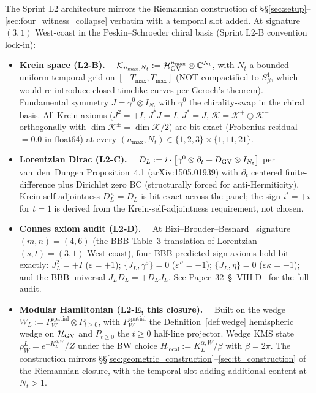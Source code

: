 \documentclass[11pt,a4paper]{article}
\theoremstyle{plain}
\theoremstyle{definition}
\newcommand{\nmax}{n_{\max}}
\begin{document}
The Sprint L2 architecture mirrors the Riemannian construction of
\S\S\ref{sec:setup}--\ref{sec:four_witness_collapse} verbatim with a
temporal slot added.  At signature $(3, 1)$ West-coast in the
Peskin--Schroeder chiral basis (Sprint L2-B convention lock-in):

\begin{itemize}\setlength{\itemsep}{2pt}
\item \textbf{Krein space (L2-B).}\ \ %
$\mathcal{K}_{\nmax, N_t} := \mathcal{H}_{\rm GV}^{\nmax} \otimes
\mathbb{C}^{N_t}$, with $N_t$ a bounded uniform temporal grid on
$[-T_{\max}, T_{\max}]$ (NOT compactified to $S^1_\beta$, which would
re-introduce closed timelike curves per Geroch's theorem).  Fundamental
symmetry $J = \gamma^0 \otimes I_{N_t}$ with $\gamma^0$ the chirality-swap
in the chiral basis.  All Krein axioms ($J^2 = +I$, $J^* J = I$,
$J^* = J$, $\mathcal{K} = \mathcal{K}^+ \oplus \mathcal{K}^-$
orthogonally with $\dim \mathcal{K}^\pm = \dim \mathcal{K}/2$) are
bit-exact (Frobenius residual $= 0.0$ in float64) at every
$(\nmax, N_t) \in \{1, 2, 3\} \times \{1, 11, 21\}$.

\item \textbf{Lorentzian Dirac (L2-C).}\ \ %
$D_L := i \cdot \bigl[\gamma^0 \otimes \partial_t + D_{\rm GV} \otimes I_{N_t}\bigr]$
per van~den~Dungen Proposition~4.1 (arXiv:1505.01939) with
$\partial_t$ centered finite-difference plus Dirichlet zero BC
(structurally forced for anti-Hermiticity).  Krein-self-adjointness
$D_L^\times = D_L$ is bit-exact across the panel; the sign $i^t = +i$
for $t = 1$ is derived from the Krein-self-adjointness requirement,
not chosen.

\item \textbf{Connes axiom audit (L2-D).}\ \ %
At Bizi--Brouder--Besnard~\cite{bizi_brouder_besnard2018} signature
$(m, n) = (4, 6)$ (the BBB Table~3 translation of Lorentzian $(s, t) = (3, 1)$
West-coast), four BBB-predicted-sign axioms hold bit-exactly:
$J_L^2 = +I$ ($\varepsilon = +1$); $\{J_L, \gamma^5\} = 0$
($\varepsilon'' = -1$); $\{J_L, \eta\} = 0$ ($\varepsilon \kappa = -1$);
and the BBB universal $J_L D_L = +D_L J_L$.  See Paper~32~\S~VIII.D~\cite{paper32}
for the full audit.

\item \textbf{Modular Hamiltonian (L2-E, this closure).}\ \ %
Built on the wedge $W_L := P_W^{\mathrm{spatial}} \otimes P_{t \geq 0}$,
with $P_W^{\mathrm{spatial}}$ the Definition~\ref{def:wedge}
hemispheric wedge on $\mathcal{H}_{\rm GV}$ and $P_{t \geq 0}$ the
$t \geq 0$ half-line projector.  Wedge KMS state $\rho_W^L = e^{-K_L^{\alpha, W}}/Z$
under the BW choice $H_{\mathrm{local}} := K_L^{\alpha, W}/\beta$
with $\beta = 2\pi$.  The construction mirrors
\S\S\ref{sec:geometric_construction}--\ref{sec:tt_construction}
of the Riemannian closure, with the temporal slot adding additional
content at $N_t > 1$.
\end{itemize}
\end{document}
